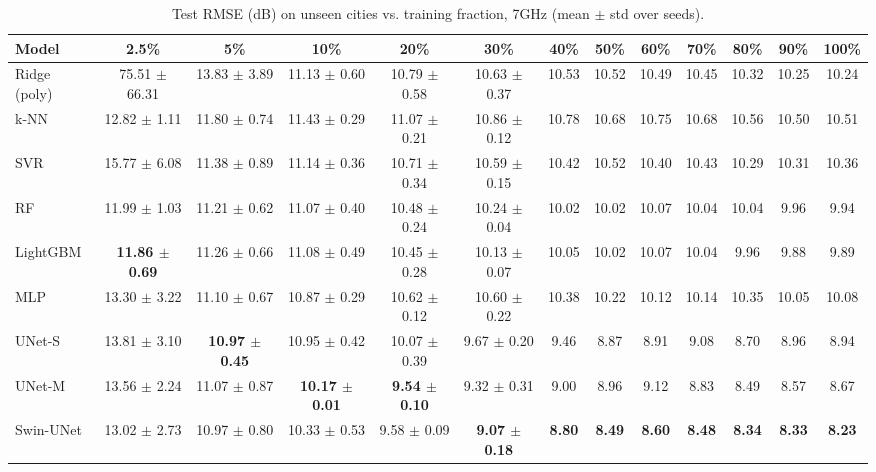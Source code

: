 \begin{table}[t]
\centering
\caption{Test RMSE (dB) on unseen cities vs. training fraction, 7GHz (mean $\pm$ std over seeds).}
\begin{tabular}{lcccccccccccc}
\hline
Model & 2.5\% & 5\% & 10\% & 20\% & 30\% & 40\% & 50\% & 60\% & 70\% & 80\% & 90\% & 100\% \\
\hline
Ridge (poly) & 75.51 $\pm$ 66.31 & 13.83 $\pm$ 3.89 & 11.13 $\pm$ 0.60 & 10.79 $\pm$ 0.58 & 10.63 $\pm$ 0.37 & 10.53 & 10.52 & 10.49 & 10.45 & 10.32 & 10.25 & 10.24 \\
k-NN & 12.82 $\pm$ 1.11 & 11.80 $\pm$ 0.74 & 11.43 $\pm$ 0.29 & 11.07 $\pm$ 0.21 & 10.86 $\pm$ 0.12 & 10.78 & 10.68 & 10.75 & 10.68 & 10.56 & 10.50 & 10.51 \\
SVR & 15.77 $\pm$ 6.08 & 11.38 $\pm$ 0.89 & 11.14 $\pm$ 0.36 & 10.71 $\pm$ 0.34 & 10.59 $\pm$ 0.15 & 10.42 & 10.52 & 10.40 & 10.43 & 10.29 & 10.31 & 10.36 \\
RF & 11.99 $\pm$ 1.03 & 11.21 $\pm$ 0.62 & 11.07 $\pm$ 0.40 & 10.48 $\pm$ 0.24 & 10.24 $\pm$ 0.04 & 10.02 & 10.02 & 10.07 & 10.04 & 10.04 & 9.96 & 9.94 \\
LightGBM & \textbf{11.86 $\pm$ 0.69} & 11.26 $\pm$ 0.66 & 11.08 $\pm$ 0.49 & 10.45 $\pm$ 0.28 & 10.13 $\pm$ 0.07 & 10.05 & 10.02 & 10.07 & 10.04 & 9.96 & 9.88 & 9.89 \\
MLP & 13.30 $\pm$ 3.22 & 11.10 $\pm$ 0.67 & 10.87 $\pm$ 0.29 & 10.62 $\pm$ 0.12 & 10.60 $\pm$ 0.22 & 10.38 & 10.22 & 10.12 & 10.14 & 10.35 & 10.05 & 10.08 \\
UNet-S & 13.81 $\pm$ 3.10 & \textbf{10.97 $\pm$ 0.45} & 10.95 $\pm$ 0.42 & 10.07 $\pm$ 0.39 & 9.67 $\pm$ 0.20 & 9.46 & 8.87 & 8.91 & 9.08 & 8.70 & 8.96 & 8.94 \\
UNet-M & 13.56 $\pm$ 2.24 & 11.07 $\pm$ 0.87 & \textbf{10.17 $\pm$ 0.01} & \textbf{9.54 $\pm$ 0.10} & 9.32 $\pm$ 0.31 & 9.00 & 8.96 & 9.12 & 8.83 & 8.49 & 8.57 & 8.67 \\
Swin-UNet & 13.02 $\pm$ 2.73 & 10.97 $\pm$ 0.80 & 10.33 $\pm$ 0.53 & 9.58 $\pm$ 0.09 & \textbf{9.07 $\pm$ 0.18} & \textbf{8.80} & \textbf{8.49} & \textbf{8.60} & \textbf{8.48} & \textbf{8.34} & \textbf{8.33} & \textbf{8.23} \\
\hline
\end{tabular}
\end{table}